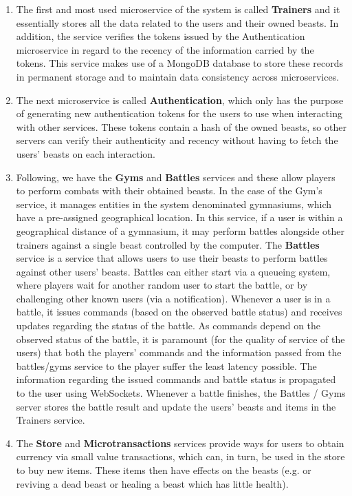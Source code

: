 \begin{enumerate}
    \item The first and most used microservice of the system is called \textbf{Trainers} and it essentially stores all the data related to the users and their owned beasts. In addition, the service verifies the tokens issued by the Authentication microservice in regard to the recency of the information carried by the tokens. This service makes use of a MongoDB  database to store these records in permanent storage and to maintain data consistency across microservices.
    
    \item The next microservice is called \textbf{Authentication}, which only has the purpose of generating new authentication tokens for the users to use when interacting with other services. These tokens contain a hash of the owned beasts, so other servers can verify their authenticity and recency without having to fetch the users' beasts on each interaction.

    \item Following, we have the \textbf{Gyms} and \textbf{Battles} services and these allow players to perform combats with their obtained beasts. In the case of the Gym's service, it manages entities in the system denominated gymnasiums, which have a pre-assigned geographical location. In this service, if a user is within a geographical distance of a gymnasium, it may perform battles alongside other trainers against a single beast controlled by the computer. The \textbf{Battles} service is a service that allows users to use their beasts to perform battles against other users' beasts. Battles can either start via a queueing system, where players wait for another random user to start the battle, or by challenging other known users (via a notification). Whenever a user is in a battle, it issues commands (based on the observed battle status) and receives updates regarding the status of the battle. As commands depend on the observed status of the battle, it is paramount (for the quality of service of the users) that both the players' commands and the information passed from the battles/gyms service to the player suffer the least latency possible. The information regarding the issued commands and battle status is propagated to the user using WebSockets. Whenever a battle finishes, the Battles / Gyms server stores the battle result and update the users' beasts and items in the Trainers service.
    
    \item The \textbf{Store} and \textbf{Microtransactions} services provide ways for users to obtain currency via small value transactions, which can, in turn, be used in the store to buy new items. These items then have effects on the beasts (e.g. or reviving a dead beast or healing a beast which has little health).


\end{enumerate}
